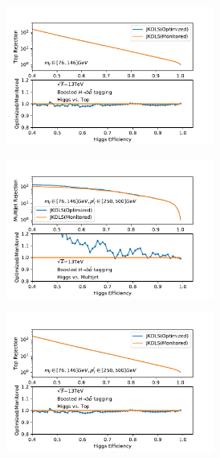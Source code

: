 \begin{figure}[htbp]
\begin{subfigure}{.5\textwidth}
    \caption{}
  \end{subfigure}
  \begin{subfigure}{.5\textwidth}
  \centering
   \includegraphics[width=0.75\textwidth]{figuresXbb/OPT/OPTopMASS.pdf}
    \caption{}
  \end{subfigure}
 \newline 
   \begin{subfigure}{.5\textwidth}
  \centering
   \includegraphics[width=0.75\textwidth]{figuresXbb/OPT/OPTQCDMASSPT1.pdf}
    \caption{}
  \end{subfigure}
  \begin{subfigure}{.5\textwidth}
  \centering
   \includegraphics[width=0.75\textwidth]{figuresXbb/OPT/OPTopMASSPT1.pdf}

\end{subfigure}
\end{figure}
